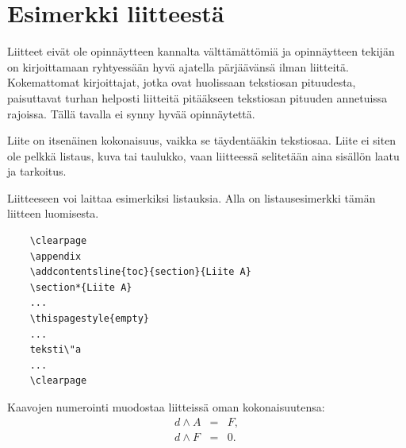\documentclass[english,12pt,a4paper,pdftex,elec,utf8]{aaltothesis}
\begin{document}
\clearpage

{}

{}

\clearpage

\thesisappendix

\section{Esimerkki liitteest\"a\label{LiiteA}}

Liitteet eiv\"at ole opinn\"aytteen kannalta v\"altt\"am\"att\"omi\"a ja
opinn\"aytteen tekij\"an on
kirjoittamaan ryhtyess\"a\"an hyv\"a ajatella p\"arj\"a\"av\"ans\"a ilman liitteit\"a.
Kokemattomat kirjoittajat, jotka ovat huolissaan
tekstiosan pituudesta, paisuttavat turhan
helposti liitteit\"a pit\"a\"akseen tekstiosan pituuden annetuissa rajoissa.
T\"all\"a tavalla ei synny hyv\"a\"a opinn\"aytett\"a.

Liite on itsen\"ainen kokonaisuus, vaikka se t\"aydent\"a\"akin tekstiosaa.
Liite ei siten ole pelkk\"a listaus, kuva tai taulukko, vaan
liitteess\"a selitet\"a\"an aina sis\"all\"on laatu ja tarkoitus.

Liitteeseen voi laittaa esimerkiksi listauksia. Alla on
listausesimerkki t\"am\"an liitteen luomisesta.

\begin{verbatim}
	\clearpage
	\appendix
	\addcontentsline{toc}{section}{Liite A}
	\section*{Liite A}
	...
	\thispagestyle{empty}
	...
	teksti\"a
	...
	\clearpage
\end{verbatim}

Kaavojen numerointi muodostaa liitteiss\"a oman kokonaisuutensa:
\begin{eqnarray}
d \wedge A  &=& F, \label{liitekaava1}\\
d \wedge F  &=& 0. \label{liitekaava2}
\end{eqnarray}
\end{document}
